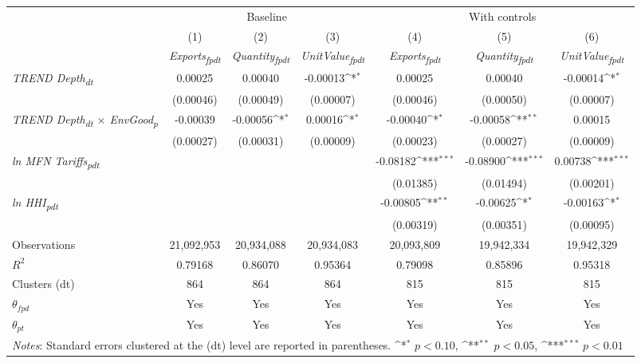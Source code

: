 {
\def\sym#1{\ifmmode^{#1}\else\(^{#1}\)\fi}
\begin{tabular}{l*{6}{c}}
\toprule
&\multicolumn{3}{c}{Baseline}&\multicolumn{3}{c}{With controls}\\\cmidrule(lr){2-4}\cmidrule(lr){5-7}
&(1)&(2)&(3)&(4)&(5)&(6)\\
&\textit{Exports\textsubscript{fpdt}}&\textit{Quantity\textsubscript{fpdt}}&\textit{UnitValue\textsubscript{fpdt}}&\textit{Exports\textsubscript{fpdt}}&\textit{Quantity\textsubscript{fpdt}}&\textit{UnitValue\textsubscript{fpdt}}\\
\midrule
\textit{TREND Depth\textsubscript{dt}} & 0.00025 & 0.00040 & -0.00013\sym{*} & 0.00025 & 0.00040 & -0.00014\sym{*}\\
 & (0.00046) & (0.00049) & (0.00007) & (0.00046) & (0.00050) & (0.00007)\\
\addlinespace
\textit{TREND Depth\textsubscript{dt} $\times$ EnvGood\textsubscript{p}} & -0.00039 & -0.00056\sym{*} & 0.00016\sym{*} & -0.00040\sym{*} & -0.00058\sym{**} & 0.00015\\
 & (0.00027) & (0.00031) & (0.00009) & (0.00023) & (0.00027) & (0.00009)\\
\addlinespace
\textit{ln MFN Tariffs\textsubscript{pdt}} &  &  &  & -0.08182\sym{***} & -0.08900\sym{***} & 0.00738\sym{***}\\
 &  &  &  & (0.01385) & (0.01494) & (0.00201)\\
\addlinespace
\textit{ln HHI\textsubscript{pdt}} &  &  &  & -0.00805\sym{**} & -0.00625\sym{*} & -0.00163\sym{*}\\
 &  &  &  & (0.00319) & (0.00351) & (0.00095)\\
\midrule
Observations & 21,092,953 & 20,934,088 & 20,934,083 & 20,093,809 & 19,942,334 & 19,942,329\\
$R^{2}$ & 0.79168 & 0.86070 & 0.95364 & 0.79098 & 0.85896 & 0.95318\\
Clusters (dt) & 864 & 864 & 864 & 815 & 815 & 815\\
$\theta_{fpd}$ & Yes & Yes & Yes & Yes & Yes & Yes\\
$\theta_{pt}$ & Yes & Yes & Yes & Yes & Yes & Yes\\
\bottomrule
\multicolumn{7}{l}{\footnotesize \textit{Notes}: Standard errors clustered at the (dt) level are reported in parentheses. \sym{*} \(p<0.10\), \sym{**} \(p<0.05\), \sym{***} \(p<0.01\)}\\
\end{tabular}
}
